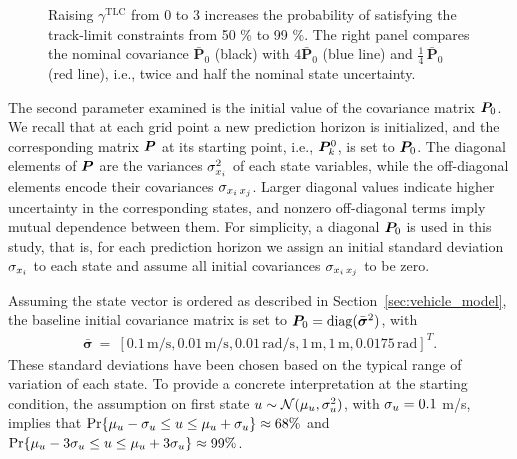 \begin{figure}
{Raising $\gamma^{\mathrm{TLC}}$ from 0 to 3 increases the probability of satisfying the track-limit constraints from 50 \% to 99 \%.
The right panel compares the nominal covariance $\bar{\mathbf P}_{0}$ (black) with $4\bar{\mathbf P}_{0}$ (blue line) and $\tfrac14\,\bar{\mathbf P}_{0}$ (red line), i.e., twice and half the nominal state uncertainty.
}
	\label{fig:ol_sensitivities}
\end{figure}

The second parameter examined is the initial value of the covariance matrix $\boldsymbol{P}_0$.
We recall that at each grid point a new prediction horizon is initialized, and the corresponding matrix $\boldsymbol{P}$ at its starting point, i.e., $\boldsymbol{P}^0_k$, is set to $\boldsymbol{P}_0$.
The diagonal elements of $\boldsymbol{P}$ are the variances $\sigma_{x_i}^2$  of each state variables, while the off-diagonal elements encode their covariances $\sigma_{x_i\,x_j}$. Larger diagonal values indicate higher uncertainty in the corresponding states, and nonzero off-diagonal terms imply mutual dependence between them. For simplicity, a diagonal $\boldsymbol{P}_0$ is used in this study, that is, for each prediction horizon we assign an initial standard deviation $\sigma_{x_i}$ to each state and assume all initial covariances $\sigma_{x_i\,x_j}$  to be zero.

 Assuming the state vector is ordered as described in Section~\ref{sec:vehicle_model}, the baseline initial covariance matrix is set to $\boldsymbol{P}_0=\operatorname{diag}(\bar{\boldsymbol{\sigma}}^2)$, with
\begin{align}
\bar{\boldsymbol{\sigma}}~=~\left[0.1\,\textrm{m/s}, 0.01\,\textrm{m/s}, 0.01\,\textrm{rad/s}, 1\,\textrm{m}, 1\,\textrm{m}, 0.0175\,\textrm{rad}\right]^T.
\end{align}
These standard deviations have been chosen based on the typical range of variation of each state. To provide a concrete interpretation at the starting condition, the assumption on first state $u \sim \mathcal{N}(\mu_u,\sigma_u^2)$, with $\sigma_u=0.1$ m/s, implies that
$\Pr\{\mu_u-\sigma_u \leq u \leq \mu_u+\sigma_u\}\approx 68\%$ and $\Pr\{\mu_u-3\sigma_u \leq u \leq \mu_u+3\sigma_u\}\approx 99\%$.
 
